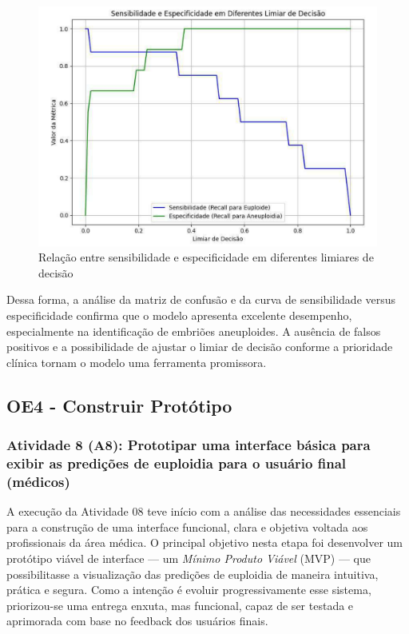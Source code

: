 \begin{figure}[h]
    \captionsetup{font=footnotesize, justification=centering, labelsep=period, position=above}
    \centering
    \includegraphics[scale=0.45]{figuras/IA/sensibilidade.pdf}
    \caption{Relação entre sensibilidade e especificidade em diferentes limiares de decisão}
    \label{fig:sensibilidade}
\end{figure}
\FloatBarrier

Dessa forma, a análise da matriz de confusão e da curva de sensibilidade versus especificidade confirma que o modelo apresenta excelente desempenho, especialmente na identificação de embriões aneuploides. A ausência de falsos positivos e a possibilidade de ajustar o limiar de decisão conforme a prioridade clínica tornam o modelo uma ferramenta promissora.

\subsection{OE4 - Construir Protótipo}
\subsubsection{Atividade 8 (A8): Prototipar uma interface básica para exibir as predições de euploidia para o usuário final (médicos)}
A execução da Atividade 08 teve início com a análise das necessidades essenciais para a construção de uma interface funcional, clara e objetiva voltada aos profissionais da área médica. O principal objetivo nesta etapa foi desenvolver um protótipo viável de interface — um \textit{Mínimo Produto Viável} (MVP) — que possibilitasse a visualização das predições de euploidia de maneira intuitiva, prática e segura. Como a intenção é evoluir progressivamente esse sistema, priorizou-se uma entrega enxuta, mas funcional, capaz de ser testada e aprimorada com base no feedback dos usuários finais.

